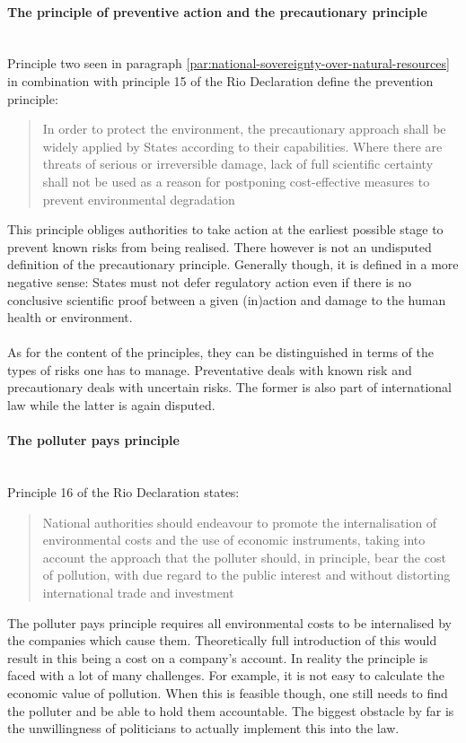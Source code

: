 \documentclass[../summary.tex]{subfiles}
\begin{document}
\paragraph{The principle of preventive action and the precautionary principle}\mbox{}
\\
Principle two seen in paragraph \ref{par:national-sovereignty-over-natural-resources} in combination with principle 15 of the Rio Declaration define the prevention principle:
\begin{quote}
	In order to protect the environment, the precautionary approach shall be widely applied by States according to their capabilities. Where there are threats of serious or irreversible damage, lack of full scientific certainty shall not be used as a reason for postponing cost-effective measures to prevent environmental degradation
\end{quote}
This principle obliges authorities to take action at the earliest possible stage to prevent known risks from being realised. There however is not an undisputed definition of the precautionary principle. Generally though, it is defined in a more negative sense: States must not defer regulatory action even if there is no conclusive scientific proof between a given (in)action and damage to the human health or environment.
\\\\
As for the content of the principles, they can be distinguished in terms of the types of risks one has to manage. Preventative deals with known risk and precautionary deals with uncertain risks. The former is also part of international law while the latter is again disputed.
\newpage

\paragraph{The polluter pays principle}\mbox{}
\\
Principle 16 of the Rio Declaration states:
\begin{quote}
	National authorities should endeavour to promote the internalisation of environmental costs and the use of economic instruments, taking into account the approach that the polluter should, in principle, bear the cost of pollution, with due regard to the public interest and without distorting international trade and investment
\end{quote}
The polluter pays principle requires all environmental costs to be internalised by the companies which cause them. Theoretically full introduction of this would result in this being a cost on a company's account. In reality the principle is faced with a lot of many challenges. For example, it is not easy to calculate the economic value of pollution. When this is feasible though, one still needs to find the polluter and be able to hold them accountable. The biggest obstacle by far is the unwillingness of politicians to actually implement this into the law.
\end{document}
